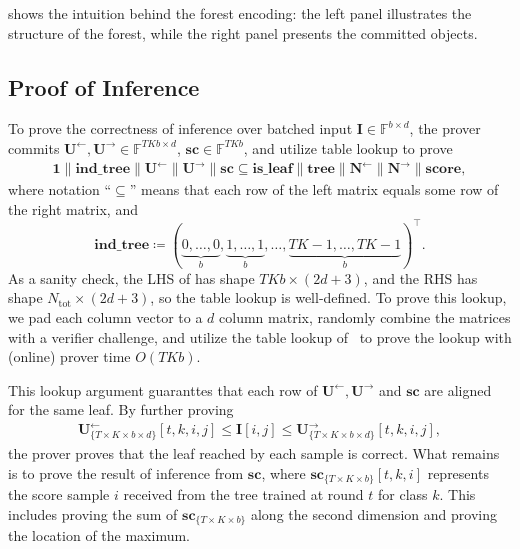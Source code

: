  shows the intuition behind
the forest encoding: the left panel illustrates the structure of the forest,
while the right panel presents the committed objects.



\subsection{Proof of Inference}

To prove the correctness of inference over batched input $\mathbf{I}\in\mathbb{F}^{b\times d}$,
the prover commits $\mathbf{U}^{\leftarrow}, \mathbf{U}^{\rightarrow}\in \mathbb{F}^{TKb\times d}$,
$\mathbf{sc}\in\mathbb{F}^{TKb}$,
and utilize table lookup to prove
\begin{align}
  \mathbf{1} \| \mathbf{ind\_tree}  \| \mathbf{U} ^{\leftarrow } \| \mathbf{U} ^{\rightarrow } \| \mathbf{sc} \subseteq
  \mathbf{is\_leaf} \| \mathbf{tree} \| \mathbf{N} ^{\leftarrow }\| \mathbf{N} ^{\rightarrow }\| \mathbf{score},\label{eq:inference-lookup-1}
\end{align}
where notation ``$\subseteq$'' means that each row of the left matrix equals some row of the right matrix, and
\[
\mathbf{ind\_tree} \coloneqq (\underbrace{0, \dots, 0}_b, \underbrace{1, \dots, 1}_{b}, \dots, \underbrace{TK-1, \dots, TK-1}_b)^\top.
\]
As a sanity check,
the LHS of  has shape $TKb\times (2d+3)$,
and the RHS has shape $N_{\mathrm{tot}}\times (2d+3)$, so the table lookup is well-defined.
To prove this lookup, we pad each column vector to a $d$ column matrix,
randomly combine the matrices with a verifier challenge,
and utilize the table lookup of~\cite{cq++24} to prove the lookup
with (online) prover time $O(TKb)$.

This lookup argument guaranttes that each row of 
$\mathbf{U}^{\leftarrow}, \mathbf{U}^{\rightarrow}$
and $\mathbf{sc}$ are aligned for the same leaf.
By further proving
\begin{align}
  \mathbf{U} ^{\leftarrow }_{\{T\times K\times b\times d\}}[t, k, i, j] \leq \mathbf{I}[i,j] \leq \mathbf{U}_{\{T\times K\times b\times d\}} ^{\rightarrow }[t, k, i, j], \label{eq:inference-interval}
\end{align}
the prover proves that the leaf reached by each sample is correct.
What remains is to prove the result of inference from $\mathbf{sc}$,
where $\mathbf{sc}_{\{T\times K\times b\}}[t,k,i]$ represents the score sample $i$
received from the tree trained at round $t$ for class $k$.
This includes proving the sum of $\mathbf{sc}_{\{T\times K\times b\}}$
along the second dimension and proving the location of the maximum.

